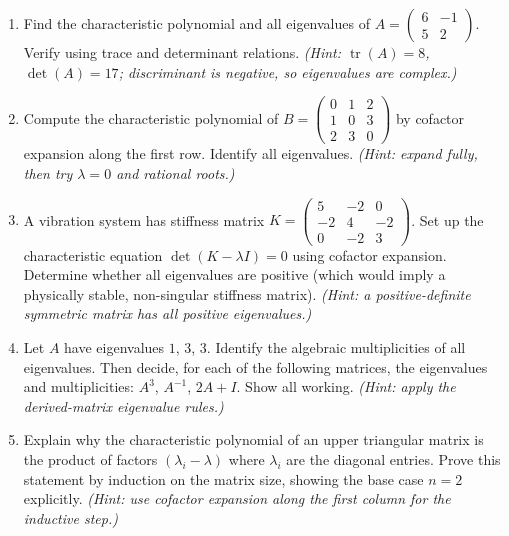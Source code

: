 \documentclass[12pt,a4paper]{article}
\begin{document}
\begin{enumerate}[leftmargin=*, label=\textbf{D\arabic*.}]
  \item Find the characteristic polynomial and all eigenvalues of
  $A = \begin{pmatrix} 6 & -1 \\ 5 & 2 \end{pmatrix}$.
  Verify using trace and determinant relations. \textit{(Hint: $\operatorname{tr}(A)=8$, $\det(A)=17$; discriminant is negative, so eigenvalues are complex.)}

  \item Compute the characteristic polynomial of
  $B = \begin{pmatrix} 0 & 1 & 2 \\ 1 & 0 & 3 \\ 2 & 3 & 0 \end{pmatrix}$
  by cofactor expansion along the first row. Identify all eigenvalues. \textit{(Hint: expand fully, then try $\lambda=0$ and rational roots.)}

  \item A vibration system has stiffness matrix
  $K = \begin{pmatrix} 5 & -2 & 0 \\ -2 & 4 & -2 \\ 0 & -2 & 3 \end{pmatrix}$.
  Set up the characteristic equation $\det(K-\lambda I)=0$ using cofactor expansion. Determine whether all eigenvalues are positive (which would imply a physically stable, non-singular stiffness matrix). \textit{(Hint: a positive-definite symmetric matrix has all positive eigenvalues.)}

  \item Let $A$ have eigenvalues $1$, $3$, $3$. Identify the algebraic multiplicities of all eigenvalues. Then decide, for each of the following matrices, the eigenvalues and multiplicities: $A^3$, $A^{-1}$, $2A+I$. Show all working. \textit{(Hint: apply the derived-matrix eigenvalue rules.)}

  \item Explain why the characteristic polynomial of an upper triangular matrix is the product of factors $(\lambda_{i}-\lambda)$ where $\lambda_i$ are the diagonal entries. Prove this statement by induction on the matrix size, showing the base case $n=2$ explicitly. \textit{(Hint: use cofactor expansion along the first column for the inductive step.)}
\end{enumerate}
\end{document}
